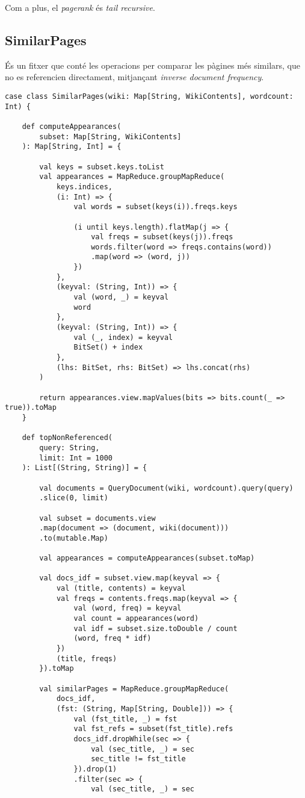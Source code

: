\documentclass{article}
\begin{document}
Com a plus, el \emph{pagerank} és \emph{tail recursive}.

\subsection{SimilarPages}

És un fitxer que conté les operacions per comparar les pàgines més similars,
que no es referencien directament, mitjançant \emph{inverse document frequency}.

\begin{lstlisting}
case class SimilarPages(wiki: Map[String, WikiContents], wordcount: Int) {

	def computeAppearances(
		subset: Map[String, WikiContents]
	): Map[String, Int] = {

		val keys = subset.keys.toList
		val appearances = MapReduce.groupMapReduce(
			keys.indices,
			(i: Int) => {
				val words = subset(keys(i)).freqs.keys

				(i until keys.length).flatMap(j => {
					val freqs = subset(keys(j)).freqs
					words.filter(word => freqs.contains(word))
					.map(word => (word, j))
				})
			},
			(keyval: (String, Int)) => {
				val (word, _) = keyval
				word
			},
			(keyval: (String, Int)) => {
				val (_, index) = keyval
				BitSet() + index
			},
			(lhs: BitSet, rhs: BitSet) => lhs.concat(rhs)
		)

		return appearances.view.mapValues(bits => bits.count(_ => true)).toMap
	}

	def topNonReferenced(
		query: String,
		limit: Int = 1000
	): List[(String, String)] = {

		val documents = QueryDocument(wiki, wordcount).query(query)
		.slice(0, limit)

		val subset = documents.view
		.map(document => (document, wiki(document)))
		.to(mutable.Map)

		val appearances = computeAppearances(subset.toMap)

		val docs_idf = subset.view.map(keyval => {
			val (title, contents) = keyval
			val freqs = contents.freqs.map(keyval => {
				val (word, freq) = keyval
				val count = appearances(word)
				val idf = subset.size.toDouble / count
				(word, freq * idf)
			})
			(title, freqs)
		}).toMap

		val similarPages = MapReduce.groupMapReduce(
			docs_idf,
			(fst: (String, Map[String, Double])) => {
				val (fst_title, _) = fst
				val fst_refs = subset(fst_title).refs
				docs_idf.dropWhile(sec => {
					val (sec_title, _) = sec
					sec_title != fst_title
				}).drop(1)
				.filter(sec => {
					val (sec_title, _) = sec


\end{lstlisting}
\end{document}
